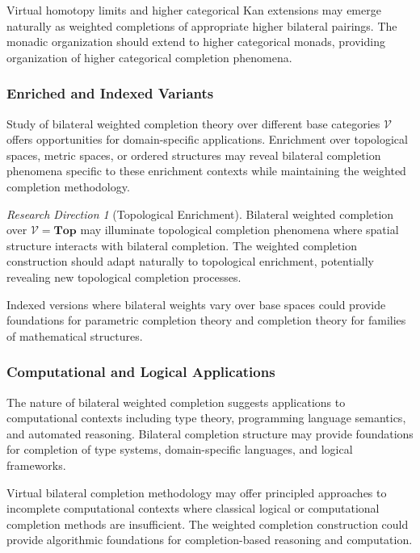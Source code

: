 \documentclass[11pt]{article}
\theoremstyle{plain}
\theoremstyle{definition}
\theoremstyle{remark}
\newtheorem{research_direction}[theorem]{Research Direction}
\newcommand{\V}{\mathcal{V}}
\begin{document}
Virtual homotopy limits and higher categorical Kan extensions may emerge naturally as weighted completions of appropriate higher bilateral pairings. The monadic organization should extend to higher categorical monads, providing organization of higher categorical completion phenomena.

\subsubsection{Enriched and Indexed Variants}

Study of bilateral weighted completion theory over different base categories $\V$ offers opportunities for domain-specific applications. Enrichment over topological spaces, metric spaces, or ordered structures may reveal bilateral completion phenomena specific to these enrichment contexts while maintaining the weighted completion methodology.

\begin{research_direction}[Topological Enrichment]
Bilateral weighted completion over $\V = \mathbf{Top}$ may illuminate topological completion phenomena where spatial structure interacts with bilateral completion. The weighted completion construction should adapt naturally to topological enrichment, potentially revealing new topological completion processes.
\end{research_direction}

Indexed versions where bilateral weights vary over base spaces could provide foundations for parametric completion theory and completion theory for families of mathematical structures.

\subsubsection{Computational and Logical Applications}

The nature of bilateral weighted completion suggests applications to computational contexts including type theory, programming language semantics, and automated reasoning. Bilateral completion structure may provide foundations for completion of type systems, domain-specific languages, and logical frameworks.

Virtual bilateral completion methodology may offer principled approaches to incomplete computational contexts where classical logical or computational completion methods are insufficient. The weighted completion construction could provide algorithmic foundations for completion-based reasoning and computation.
\end{document}
